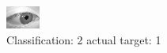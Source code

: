 \begin{figure}[h!]
\begin{center}
\includegraphics[width=0.60\columnwidth]{figures/ID2764_class_2_target_1.png}
\end{center}
\caption{ Classification: 2 actual target: 1}
\label{fig:ID2764_class_2_target_1}
\end{figure}
